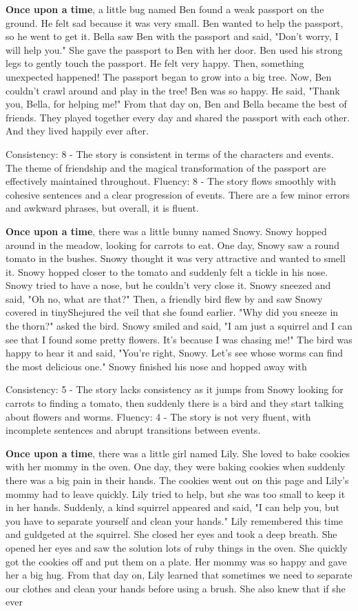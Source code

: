 \documentclass{article}
\begin{document}
\textbf{Once upon a time}, a little bug named Ben found a weak passport on the ground. He felt sad because it was very small. Ben wanted to help the passport, so he went to get it. Bella saw Ben with the passport and said, "Don't worry, I will help you." She gave the passport to Ben with her door. Ben used his strong legs to gently touch the passport. He felt very happy. Then, something unexpected happened! The passport began to grow into a big tree. Now, Ben couldn't crawl around and play in the tree! Ben was so happy. He said, "Thank you, Bella, for helping me!" From that day on, Ben and Bella became the best of friends. They played together every day and shared the passport with each other. And they lived happily ever after.

Consistency: 8 - The story is consistent in terms of the characters and events. The theme of friendship and the magical transformation of the passport are effectively maintained throughout.
Fluency: 8 - The story flows smoothly with cohesive sentences and a clear progression of events. There are a few minor errors and awkward phrases, but overall, it is fluent.

\textbf{Once upon a time}, there was a little bunny named Snowy. Snowy hopped around in the meadow, looking for carrots to eat. One day, Snowy saw a round tomato in the bushes. Snowy thought it was very attractive and wanted to smell it. Snowy hopped closer to the tomato and suddenly felt a tickle in his nose. Snowy tried to have a nose, but he couldn't very close it. Snowy sneezed and said, "Oh no, what are that?" Then, a friendly bird flew by and saw Snowy covered in tinyShejured the veil that she found earlier. "Why did you sneeze in the thorn?" asked the bird. Snowy smiled and said, "I am just a squirrel and I can see that I found some pretty flowers. It's because I was chasing me!" The bird was happy to hear it and said, "You're right, Snowy. Let's see whose worms can find the most delicious one." Snowy finished his nose and hopped away with

Consistency: 5 - The story lacks consistency as it jumps from Snowy looking for carrots to finding a tomato, then suddenly there is a bird and they start talking about flowers and worms.
Fluency: 4 - The story is not very fluent, with incomplete sentences and abrupt transitions between events.

\textbf{Once upon a time}, there was a little girl named Lily. She loved to bake cookies with her mommy in the oven. One day, they were baking cookies when suddenly there was a big pain in their hands. The cookies went out on this page and Lily's mommy had to leave quickly. Lily tried to help, but she was too small to keep it in her hands. Suddenly, a kind squirrel appeared and said, "I can help you, but you have to separate yourself and clean your hands." Lily remembered this time and guldgeted at the squirrel. She closed her eyes and took a deep breath. She opened her eyes and saw the solution lots of ruby things in the oven. She quickly got the cookies off and put them on a plate. Her mommy was so happy and gave her a big hug. From that day on, Lily learned that sometimes we need to separate our clothes and clean your hands before using a brush. She also knew that if she ever
\end{document}

